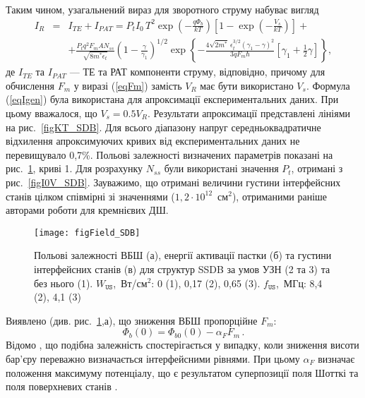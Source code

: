 Таким чином, узагальнений вираз для зворотного струму набуває вигляд
\begin{eqnarray}
\label{eqIgen}
 I_R&=&I_{TE}+I_{P\!AT}=P_tI_0\,T^2\exp\left(-\frac{q\Phi_b}{kT}\right)\left[1-\exp\left(-\frac{V_s}{kT}\right)\right]+\\
 &&+\frac{P_tq^2F_mAN_{ss}}{\sqrt{8m^*\epsilon_t}}\left(1-\frac{\gamma}{\gamma_1}\right)^{1/2}\exp
    \left\{-\frac{4\sqrt{2m^*}\,\epsilon_t^{3/2}\left(\gamma_1-\gamma\right)^2}{3qF_m\hbar}
    [\gamma_1+\frac{1}{2}\gamma]\right\}\nonumber,
\end{eqnarray}
де
$I_{TE}$ та $I_{P\!AT}$ --- ТЕ та РАТ компоненти струму, відповідно,
причому для обчислення $F_m$ у виразі (\ref{eqFm}) замість $V_R$ має бути використано $V_s$.
Формула (\ref{eqIgen}) була використана для апроксимації експериментальних даних.
При цьому вважалося, що $V_s=0.5V_R$.
Результати апроксимації представлені лініями на рис.~\ref{figKT_SDB}.
Для всього діапазону напруг середньоквадратичне відхилення апроксимуючих кривих від експериментальних даних не перевищувало 0,7\%.
Польові залежності визначених параметрів показані на рис.~\ref{figField_SDB}, криві 1.
Для розрахунку $N_{ss}$ були використані значення $P_t$, отримані з рис.~\ref{figI0V_SDB}.
Зауважимо, що отримані величини густини інтерфейсних станів цілком співмірні зі значеннями ($1,2\cdot10^{12}$~см$^{2}$),
отриманими раніше авторами роботи \cite{PipinsFTP} для кремнієвих ДШ.


\begin{figure}
\center
\texttt{[image: figField\_SDB]}
\caption{\label{figField_SDB}
Польові залежності ВБШ (а), енергії активації пастки (б) та густини інтерфейсних станів (в) для структур SSDB за умов УЗН (2 та 3) та без нього (1).
$W_\mathtt{US}$,~Вт/см$^2$: 0 (1), 0,17 (2), 0,65 (3).
$f_\mathtt{US}$,~МГц: 8,4 (2), 4,1 (3)
}%
\end{figure}

Виявлено (див. рис.~\ref{figField_SDB},а), що зниження ВБШ пропорційне $F_m$:
\begin{equation}\label{eqFbE}
    \Phi_{b}(0)=\Phi_{b0}(0)-\alpha_{F} F_m\,.
\end{equation}
Відомо \cite{Tung:MSE,Rhoderick1988,Em:Parker},
що подібна залежність спостерігається у випадку, коли зниження висоти бар'єру переважно визначається інтерфейсними рівнями.
При цьому  $\alpha_{F}$ визначає положення максимуму потенціалу, що є результатом суперпозиції поля Шотткі та поля поверхневих станів \cite{Em:Parker}.

